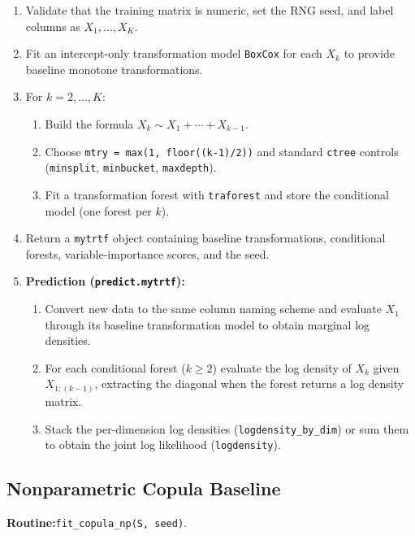 \documentclass[11pt,a4paper,twoside]{book}\usepackage[]{graphicx}\usepackage[]{xcolor}
\begin{document}
\begin{enumerate}
  \item Validate that the training matrix is numeric, set the RNG seed, and label columns as $X_1,\ldots,X_K$.
  \item Fit an intercept-only transformation model \texttt{BoxCox} for each $X_k$ to provide baseline monotone transformations.
  \item For $k = 2,\ldots,K$:
    \begin{enumerate}
      \item Build the formula $X_k \sim X_1 + \cdots + X_{k-1}$.
      \item Choose \texttt{mtry = max(1, floor((k-1)/2))} and standard \texttt{ctree} controls (\texttt{minsplit}, \texttt{minbucket}, \texttt{maxdepth}).
      \item Fit a transformation forest with \texttt{traforest} and store the conditional model (one forest per $k$).
    \end{enumerate}
  \item Return a \texttt{mytrtf} object containing baseline transformations, conditional forests, variable-importance scores, and the seed.

  \item \textbf{Prediction (\texttt{predict.mytrtf}):}
    \begin{enumerate}
      \item Convert new data to the same column naming scheme and evaluate $X_1$ through its baseline transformation model to obtain marginal log densities.
      \item For each conditional forest ($k\geq 2$) evaluate the log density of $X_k$ given $X_{1:(k-1)}$, extracting the diagonal when the forest returns a log density matrix.
      \item Stack the per-dimension log densities (\texttt{logdensity\_by\_dim}) or sum them to obtain the joint log likelihood (\texttt{logdensity}).
    \end{enumerate}
\end{enumerate}

\subsection{Nonparametric Copula Baseline}\label{app:copula}

\textbf{Routine:}\quad\texttt{fit\_copula\_np(S, seed)}.
\end{document}
